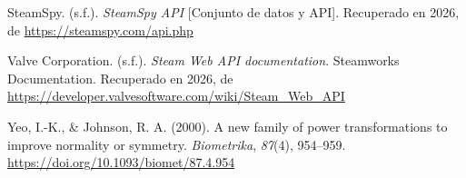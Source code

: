 \documentclass[11pt,letterpaper]{article}
\begin{document}
\begin{list}{}{\setlength{\leftmargin}{1.5em}\setlength{\itemindent}{-1.5em}\setlength{\itemsep}{0.7em}\setlength{\parsep}{0pt}}
\item SteamSpy. (s.f.). \textit{SteamSpy API} [Conjunto de datos y API]. Recuperado en 2026, de \url{https://steamspy.com/api.php}

\item Valve Corporation. (s.f.). \textit{Steam Web API documentation}. Steamworks Documentation. Recuperado en 2026, de \url{https://developer.valvesoftware.com/wiki/Steam_Web_API}

\item Yeo, I.-K., \& Johnson, R. A. (2000). A new family of power transformations to improve normality or symmetry. \textit{Biometrika}, \textit{87}(4), 954--959. \url{https://doi.org/10.1093/biomet/87.4.954}

\end{list}
\end{document}
